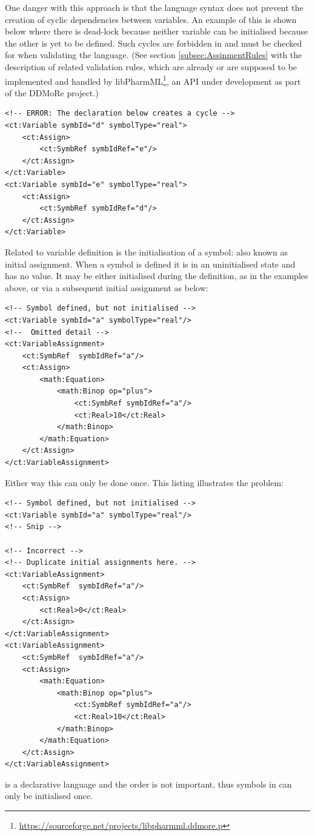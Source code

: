 One danger with this approach is that the language syntax does not
prevent the creation of cyclic dependencies between variables. An
example of this is shown below where there is dead-lock because neither variable can be initialised
because the other is yet to be defined. Such cycles are forbidden in
\pharmml and must be checked for when validating the language.
(See section \ref{subsec:AssinmentRules} with the description of related
validation rules, which are already or are supposed to be implemented 
and handled by 
libPharmML\footnote{\url{https://sourceforge.net/projects/libpharmml.ddmore.p}}, 
an API under development as part of the DDMoRe project.)
\lstset{language=XML}
\begin{lstlisting}
<!-- ERROR: The declaration below creates a cycle -->
<ct:Variable symbId="d" symbolType="real">
    <ct:Assign>
        <ct:SymbRef symbIdRef="e"/>
    </ct:Assign>
</ct:Variable>
<ct:Variable symbId="e" symbolType="real">
    <ct:Assign>
        <ct:SymbRef symbIdRef="d"/>
    </ct:Assign>
</ct:Variable>
\end{lstlisting}

Related to variable definition is the initialisation of a symbol: also
known as initial assignment. When a symbol is defined it is in an
uninitialised state and has no value. It may be either initialised
during the definition, as in the examples above, or via a subsequent
initial assignment as below:

\lstset{language=XML}
\begin{lstlisting}
<!-- Symbol defined, but not initialised -->
<ct:Variable symbId="a" symbolType="real"/>
<!--  Omitted detail -->
<ct:VariableAssignment>
    <ct:SymbRef  symbIdRef="a"/>
    <ct:Assign>
        <math:Equation>
            <math:Binop op="plus">
                <ct:SymbRef symbIdRef="a"/>
                <ct:Real>10</ct:Real>
            </math:Binop>
        </math:Equation>
    </ct:Assign>
</ct:VariableAssignment>
\end{lstlisting}

Either way this can only be done once. This listing illustrates the problem:
\lstset{language=XML}
\begin{lstlisting}
<!-- Symbol defined, but not initialised -->
<ct:Variable symbId="a" symbolType="real"/>
<!-- Snip -->

<!-- Incorrect -->
<!-- Duplicate initial assignments here. -->
<ct:VariableAssignment>
    <ct:SymbRef  symbIdRef="a"/>
    <ct:Assign>
        <ct:Real>0</ct:Real>
    </ct:Assign>
</ct:VariableAssignment>
<ct:VariableAssignment>
    <ct:SymbRef  symbIdRef="a"/>
    <ct:Assign>
        <math:Equation>
            <math:Binop op="plus">
                <ct:SymbRef symbIdRef="a"/>
                <ct:Real>10</ct:Real>
            </math:Binop>
        </math:Equation>
    </ct:Assign>
</ct:VariableAssignment>
\end{lstlisting}
\pharmml is a declarative language and the order is not important, 
thus symbols in \pharmml can only be initialised
once.


